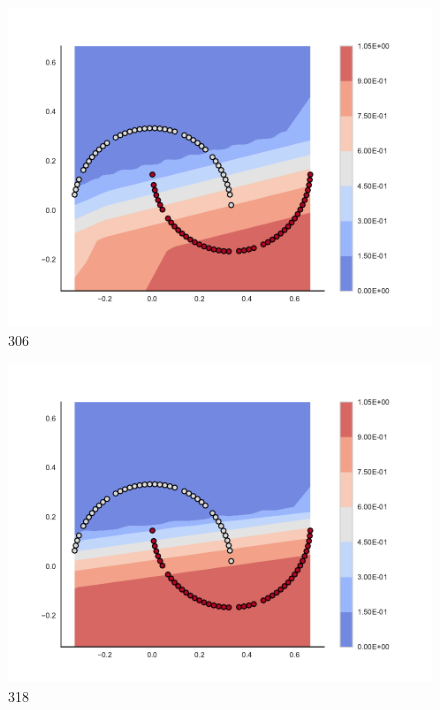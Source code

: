 \begin{subfigure}[b]{0.09\textwidth}
    \includegraphics[clip, trim=2.35cm 1.75cm 4.5cm 0cm,width=\textwidth]{img/convergence/306.pdf}
    \caption{306}
    \label{fig:convergence_306}
\end{subfigure}
%
\begin{subfigure}[b]{0.09\textwidth}
    \includegraphics[clip, trim=2.35cm 1.75cm 4.5cm 0cm,width=\textwidth]{img/convergence/318.pdf}
    \caption{318}
    \label{fig:convergence_318}
\end{subfigure}
%
